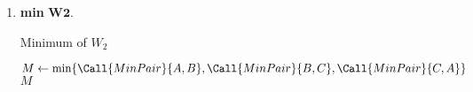 \documentclass[12pt]{article}
\begin{document}
\begin{solution}
\begin{enumerate}[wide]
\begin{proof}[Proof of correctness]
                Thus, $M = \max\Call{W1}{i, j, k}$ and so the function returns
                the correct value.
            \end{proof}
            \begin{proof}[Proof of termination/runtime]
                The runtime of \textsc{MaxPair} is $O(1)$.
                Thus the runtime of \textsc{MaxW1} is $O(1)$.
            \end{proof}
        \item \textbf{min} $\bm{W2}$.
            \begin{algorithm}[H]
                \caption{Minimum of $W_2$}
                \begin{algorithmic}[1]
                        \State $M \gets \min\set{\Call{MinPair}{A, B},
                            \Call{MinPair}{B, C}, \Call{MinPair}{C, A}}$
                        \State \Return $M$
                    \EndFunction

\end{algorithmic}
\end{algorithm}
\end{enumerate}
\end{solution}
\end{document}
